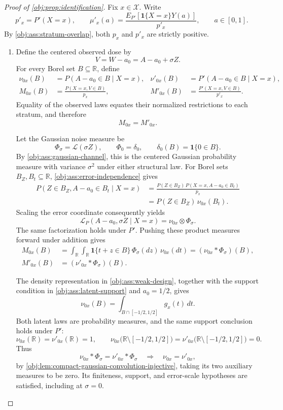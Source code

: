 \begin{proof}[Proof of \cref{obj:prop:identification}]
Fix \(x\in\mathcal X\). Write
\[
p'_x=P'(X=x),
\qquad
\mu'_x(a)=\frac{E_{P'}[\mathbf1\{X=x\}Y(a)]}{p'_x},
\qquad a\in[0,1].
\]
By \cref{obj:ass:stratum-overlap}, both \(p_x\) and \(p'_x\) are strictly positive.

\begin{enumerate}
\item Define the centered observed dose by
\[
V=W-a_0=A-a_0+\sigma Z.
\]
For every Borel set \(B\subseteq\mathbb R\), define
\[
\begin{aligned}
\nu_{0x}(B)&=P(A-a_0\in B\mid X=x),
&
\nu'_{0x}(B)&=P'(A-a_0\in B\mid X=x),\\
M_{0x}(B)&=\frac{P(X=x,V\in B)}{p_x},
&
M'_{0x}(B)&=\frac{P'(X=x,V\in B)}{p'_x}.
\end{aligned}
\]
Equality of the observed laws equates their normalized restrictions to each stratum, and therefore
\[
M_{0x}=M'_{0x}.
\]

Let the Gaussian noise measure be
\[
\Phi_\sigma=\mathcal L(\sigma Z),
\qquad
\Phi_0=\delta_0,
\qquad
\delta_0(B)=\mathbf1\{0\in B\}.
\]
By \cref{obj:ass:gaussian-channel}, this is the centered Gaussian probability measure with variance \(\sigma^2\) under either structural law. For Borel sets \(B_Z,B_t\subseteq\mathbb R\), \cref{obj:ass:error-independence} gives
\[
\begin{aligned}
P(Z\in B_Z,A-a_0\in B_t\mid X=x)
&=\frac{P(Z\in B_Z)\,P(X=x,A-a_0\in B_t)}{p_x}\\
&=P(Z\in B_Z)\,\nu_{0x}(B_t).
\end{aligned}
\]
Scaling the error coordinate consequently yields
\[
\mathcal L_P(A-a_0,\sigma Z\mid X=x)
=\nu_{0x}\otimes\Phi_\sigma.
\]
The same factorization holds under \(P'\). Pushing these product measures forward under addition gives
\[
\begin{aligned}
M_{0x}(B)
&=\int_{\mathbb R}\int_{\mathbb R}
\mathbf1\{t+z\in B\}\,\Phi_\sigma(dz)\,\nu_{0x}(dt)
=(\nu_{0x}*\Phi_\sigma)(B),\\
M'_{0x}(B)&=(\nu'_{0x}*\Phi_\sigma)(B).
\end{aligned}
\]

The density representation in \cref{obj:ass:weak-design}, together with the support condition in \cref{obj:ass:latent-support} and \(a_0=1/2\), gives
\[
\nu_{0x}(B)=\int_{B\cap[-1/2,1/2]}g_x(t)\,dt.
\]
Both latent laws are probability measures, and the same support conclusion holds under \(P'\):
\[
\nu_{0x}(\mathbb R)=\nu'_{0x}(\mathbb R)=1,
\qquad
\nu_{0x}\bigl(\mathbb R\setminus[-1/2,1/2]\bigr)
=\nu'_{0x}\bigl(\mathbb R\setminus[-1/2,1/2]\bigr)=0.
\]
Thus
\[
\nu_{0x}*\Phi_\sigma=\nu'_{0x}*\Phi_\sigma
\quad\Longrightarrow\quad
\nu_{0x}=\nu'_{0x},
\]
by \cref{obj:lem:compact-gaussian-convolution-injective}, taking its two auxiliary measures to be zero. Its finiteness, support, and error-scale hypotheses are satisfied, including at \(\sigma=0\).


\end{enumerate}
\end{proof}
